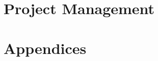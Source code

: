 \documentclass[11pt,a4paper,oneside]{report}
\begin{document}
\chapter{Project Management}




\nocite{*} %





\chapter{Appendices}
\end{document}
